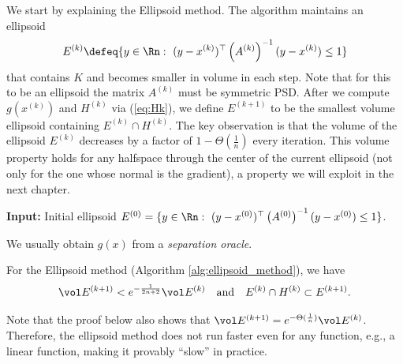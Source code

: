 We start by explaining the Ellipsoid method. The algorithm maintains
an ellipsoid
\[
E^{(k)}\defeq\{y\in\Rn:\ (y-x^{(k)})^{\top}\left(A^{(k)}\right)^{-1}(y-x^{(k)})\leq1\}
\]
that contains $K$ and becomes smaller in volume in each step. Note
that for this to be an ellipsoid the matrix $A^{(k)}$ must be symmetric
PSD. After we compute $g(x^{(k)})$ and $H^{(k)}$ via (\ref{eq:Hk}),
we define $E^{(k+1)}$ to be the smallest volume ellipsoid containing
$E^{(k)}\cap H^{(k)}$. The key observation is that the volume of
the ellipsoid $E^{(k)}$ decreases by a factor of $1-\Theta(\frac{1}{n})$
every iteration. This volume property holds for any halfspace through
the center of the current ellipsoid (not only for the one whose normal
is the gradient), a property we will exploit in the next chapter.

\begin{algorithm2e}[H]

\caption{$\mathtt{Ellipsoid}$}\label{alg:ellipsoid_method}

\SetAlgoLined

\textbf{Input:} Initial ellipsoid $E^{(0)}=\{y\in\Rn:\ (y-x^{(0)})^{\top}\left(A^{(0)}\right)^{-1}(y-x^{(0)})\leq1\}$.


\end{algorithm2e}
\begin{rem}
We usually obtain $g(x)$ from a \emph{separation oracle}.
\end{rem}

\begin{lem}
\label{lem:ellipsoid_vol_decrease}For the Ellipsoid method (Algorithm
\ref{alg:ellipsoid_method}), we have 
\[
\vol E^{(k+1)}<e^{-\frac{1}{2n+2}}\vol E^{(k)}\quad\mbox{and}\quad E^{(k)}\cap H^{(k)}\subset E^{(k+1)}.
\]
\end{lem}

\begin{rem}
Note that the proof below also shows that $\vol E^{(k+1)}=e^{-\Theta(\frac{1}{n})}\vol E^{(k)}$.
Therefore, the ellipsoid method does not run faster even for any function,
e.g., a linear function, making it provably ``slow'' in practice.
\end{rem}

